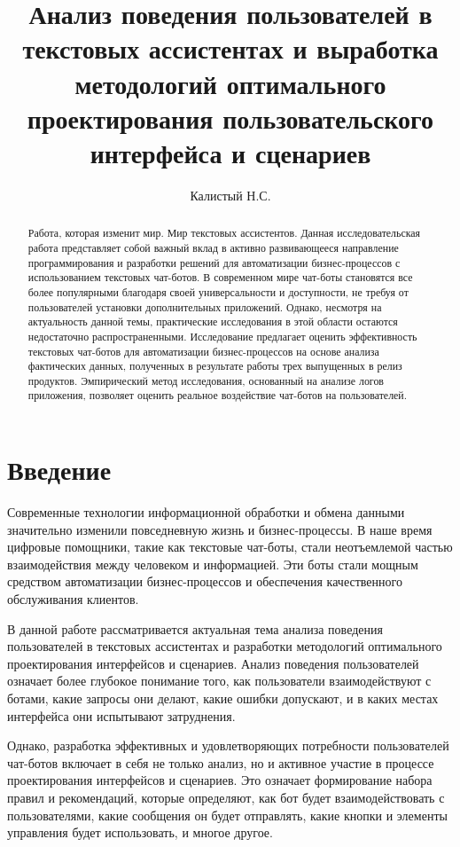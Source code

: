 \documentclass{article}
\title{Анализ поведения пользователей в текстовых ассистентах и выработка методологий оптимального проектирования пользовательского интерфейса и сценариев}
\author{Калистый Н.С.}
\begin{document}
\maketitle

\begin{abstract}
Работа, которая изменит мир. Мир текстовых ассистентов.
Данная исследовательская работа представляет собой важный вклад в активно развивающееся направление программирования и разработки решений для автоматизации бизнес-процессов с использованием текстовых чат-ботов. В современном мире чат-боты становятся все более популярными благодаря своей универсальности и доступности, не требуя от пользователей установки дополнительных приложений.
Однако, несмотря на актуальность данной темы, практические исследования в этой области остаются недостаточно распространенными. Исследование предлагает оценить эффективность текстовых чат-ботов для автоматизации бизнес-процессов на основе анализа фактических данных, полученных в результате работы трех выпущенных в релиз продуктов. Эмпирический метод исследования, основанный на анализе логов приложения, позволяет оценить реальное воздействие чат-ботов на пользователей.
\end{abstract}

\section{Введение}
Современные технологии информационной обработки и обмена данными значительно изменили повседневную жизнь и бизнес-процессы. В наше время цифровые помощники, такие как текстовые чат-боты, стали неотъемлемой частью взаимодействия между человеком и информацией. Эти боты стали мощным средством автоматизации бизнес-процессов и обеспечения качественного обслуживания клиентов.

В данной работе рассматривается актуальная тема анализа поведения пользователей в текстовых ассистентах и разработки методологий оптимального проектирования интерфейсов и сценариев. Анализ поведения пользователей означает более глубокое понимание того, как пользователи взаимодействуют с ботами, какие запросы они делают, какие ошибки допускают, и в каких местах интерфейса они испытывают затруднения.

Однако, разработка эффективных и удовлетворяющих потребности пользователей чат-ботов включает в себя не только анализ, но и активное участие в процессе проектирования интерфейсов и сценариев. Это означает формирование набора правил и рекомендаций, которые определяют, как бот будет взаимодействовать с пользователями, какие сообщения он будет отправлять, какие кнопки и элементы управления будет использовать, и многое другое.
\end{document}
